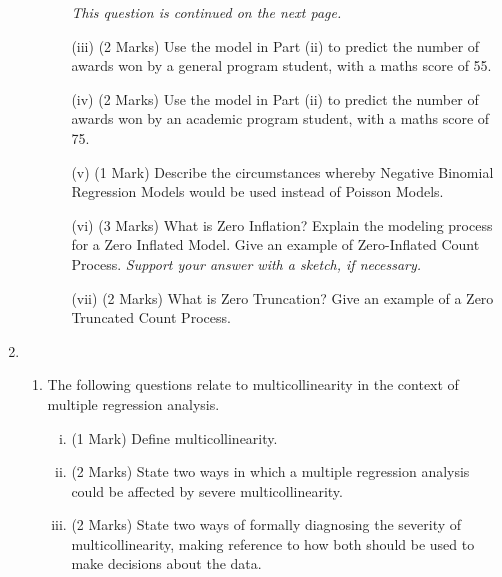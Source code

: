 \documentclass[a4paper,12pt]{article}
\begin{document}
\begin{enumerate}
\begin{enumerate}[(a)]
\begin{itemize}
\begin{framed}
\begin{verbatim}
		\end{verbatim}
	\end{framed}

\noindent \textit{This question is continued on the next page.}
\newpage
	\item[(iii)] (2 Marks) Use the model in Part (ii) to predict the number of awards won by a general program student, with a maths score of 55.
	
	\item[(iv)] (2 Marks) Use the model in Part (ii) to predict the number of awards won by an academic program student, with a maths score of 75.
	
	\item[(v)] (1 Mark) Describe the circumstances whereby Negative Binomial Regression Models would be used instead of Poisson Models.	
	\item[(vi)] (3 Marks)
	What is Zero Inflation? Explain the modeling process for a Zero Inflated Model. Give an example of Zero-Inflated Count Process. \textit{Support your answer with a sketch, if necessary.}
	
	

	
	
	
	\item[(vii)] (2 Marks) What is Zero Truncation? Give an example of a Zero Truncated Count Process.
\end{itemize}


\end{enumerate}
\bigskip
\item 
\begin{enumerate}

	\item The following questions relate to multicollinearity in the context of multiple
regression analysis.
\begin{enumerate}[(i)]
	\item (1 Mark) Define multicollinearity.
	\item (2 Marks) State two ways in which a multiple regression analysis could be affected by severe
	multicollinearity.
	\item (2 Marks) State two ways of formally diagnosing the severity of multicollinearity, making reference to how both should be used to make decisions about the data.
\end{enumerate}


\end{enumerate}
\end{enumerate}
\end{document}
